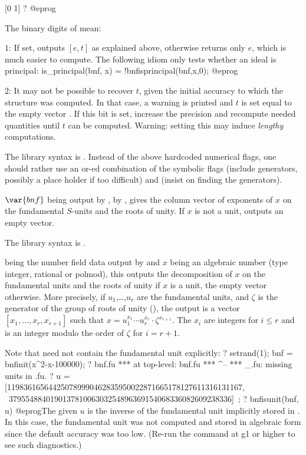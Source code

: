 [0 1]
? %
@eprog

\noindent The binary digits of \fl mean:

\item $1$: If set, outputs $[e,t]$ as explained above, otherwise returns
only $e$, which is much easier to compute. The following idiom only tests
whether an ideal is principal:
\bprog
  is_principal(bnf, x) = !bnfisprincipal(bnf,x,0);
@eprog

\item $2$: It may not be possible to recover $t$, given the initial accuracy
to which the  structure was computed. In that case, a warning is
printed and $t$ is set equal to the empty vector \kbd{[]\til}. If this bit is
set, increase the precision and recompute needed quantities until $t$ can be
computed. Warning: setting this may induce \emph{lengthy} computations.

The library syntax is .
Instead of the above hardcoded numerical flags, one should
rather use an or-ed combination of the symbolic flags  (include
generators, possibly a place holder if too difficult) and 
(insist on finding the generators).

\label{se:bnfissunit}
$\var{bnf}$ being output by
,  by , gives the column vector of
exponents of $x$ on the fundamental $S$-units and the roots of unity.
If $x$ is not a unit, outputs an empty vector.

The library syntax is .

\label{se:bnfisunit}
 being the number field data
output by  and $x$ being an algebraic number (type integer,
rational or polmod), this outputs the decomposition of $x$ on the fundamental
units and the roots of unity if $x$ is a unit, the empty vector otherwise.
More precisely, if $u_1$,\dots,$u_r$ are the fundamental units, and $\zeta$
is the generator of the group of roots of unity (), the output is
a vector $[x_1,\dots,x_r,x_{r+1}]$ such that $x=u_1^{x_1}\cdots
u_r^{x_r}\cdot\zeta^{x_{r+1}}$. The $x_i$ are integers for $i\le r$ and is an
integer modulo the order of $\zeta$ for $i=r+1$.

Note that  need not contain the fundamental unit explicitly:
\bprog
? setrand(1); bnf = bnfinit(x^2-x-100000);
? bnf.fu
  ***   at top-level: bnf.fu
  ***                     ^--
  *** _.fu: missing units in .fu.
? u = [119836165644250789990462835950022871665178127611316131167, \
       379554884019013781006303254896369154068336082609238336]~;
? bnfisunit(bnf, u)
@eprog\noindent The given $u$ is the inverse of the fundamental unit
implicitly stored in \var{bnf}. In this case, the fundamental unit was not
computed and stored in algebraic form since the default accuracy was too
low. (Re-run the command at \bs g1 or higher to see such diagnostics.)

